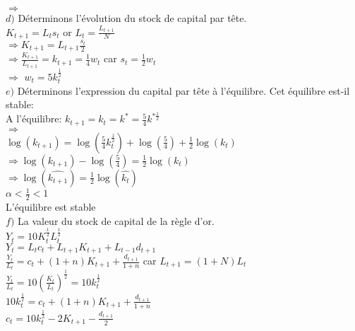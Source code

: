 \documentclass[11pt,twoside,a4paper]{article}
\begin{document}
$ \Rightarrow$   \\

$d)$ Déterminons l'évolution du stock de capital par tête.\\
$K_{t+1}=L_t s_t$ \: or \: $L_t=\frac{L_{t+1}}{N}$\\
$\Rightarrow  K_{t+1}=L_{t+1}\frac{s_t}{2}$\\
$\Rightarrow \frac{K_{t+1}}{L_{t+1}}=k_{t+1}=\frac{1}{4}w_t$ \: car $s_t = \frac{1}{2} w_t $\\
$ \Rightarrow$   \: $w_t = 5k_t^{\frac{1}{2}} $\\

$e)$ Déterminons l'expression du capital par tête à l'équilibre. Cet équilibre
est-il stable:\\

A l'équilibre: \: $k_{t+1}=k_t=k^*=\frac{5}{4}k^{*\frac{1}{2}}$\\

$ \Rightarrow$   \\

$\log{(k_{t+1})}=\log{(\frac{5}{4}k_t^{\frac{1}{2}})}+\log{(\frac{5}{4})}+\frac{1}{2}\log{(k_t)}$\\

$
\Rightarrow \log{(k_{t+1})} -\log{(\frac{5}{4})}=\frac{1}{2}\log{(k_t)}$\\

$
\Rightarrow \log{(\widehat{k_{t+1}})}=\frac{1}{2}\log{(\widehat{k_{t}})}$\\

$
 \alpha <\frac{1}{2}<1$\\
 L'équilibre est stable\\
 
 $ f)$ La valeur du stock de capital de la règle d'or.\\
 $Y_t=10K_t^{\frac{1}{2}}L_t^{\frac{1}{2}}$\\
 $Y_t=L_tc_t+L_{t+1}K_{t+1}+L_{t-1}d_{t+1}$\\
 $\frac{Y_t}{L_t}=c_t+(1+n)K_{t+1}+\frac{d_{t+1}}{1+n}$\: car $L_{t+1}=(1+N)L_t$\\
$ \frac{Y_t}{L_t}=10(\frac{K_t}{L_t})^{\frac{1}{2}}=10k_t^{\frac{1}{2}}$\\

$ 10k_t^{\frac{1}{2}}=c_t+(1+n)K_{t+1}+\frac{d_{t+1}}{1+n}$\\
 
 $ c_t=10k_t^{\frac{1}{2}}-2K_{t+1}-\frac{d_{t+1}}{2}$\\
 
\end{document}
